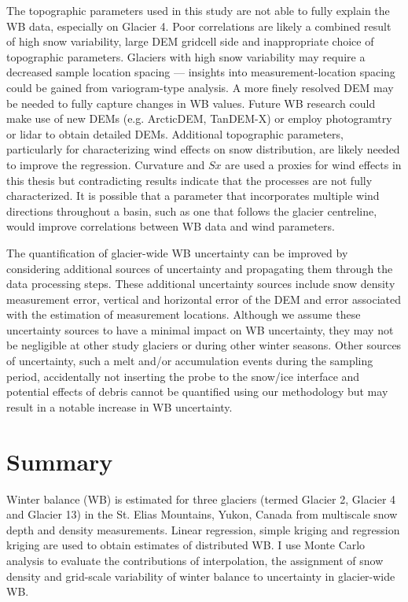 \documentclass{sfuthesis}
\begin{document}
The topographic parameters used in this study are not able to fully explain the WB data, especially on Glacier 4. Poor correlations are likely a combined result of high snow variability, large DEM gridcell side and inappropriate choice of topographic parameters. Glaciers with high snow variability may require a decreased sample location spacing --- insights into measurement-location spacing could be gained from variogram-type analysis. A more finely resolved DEM may be needed to fully capture changes in WB values. Future WB research could make use of new DEMs (e.g. ArcticDEM, TanDEM-X) or employ photogramtry or lidar to obtain detailed DEMs. Additional topographic parameters, particularly for characterizing wind effects on snow distribution, are likely needed to improve the regression. Curvature and $Sx$ are used a proxies for wind effects in this thesis but contradicting results indicate that the processes are not fully characterized. It is possible that a parameter that incorporates multiple wind directions throughout a basin, such as one that follows the glacier centreline, would improve correlations between WB data and wind parameters. 

The quantification of glacier-wide WB uncertainty can be improved by considering additional sources of uncertainty and propagating them through the data processing steps. These additional uncertainty sources include snow density measurement error, vertical and horizontal error of the DEM and error associated with the estimation of measurement locations. Although we assume these uncertainty sources to have a minimal impact on WB uncertainty, they may not be negligible at other study glaciers or during other winter seasons. Other sources of uncertainty, such a melt and/or accumulation events during the sampling period, accidentally not inserting the probe to the snow/ice interface and potential effects of debris cannot be quantified using our methodology but may result in a notable increase in WB uncertainty. 

\section{Summary}

Winter balance (WB) is estimated for three glaciers (termed Glacier 2, Glacier 4 and Glacier 13) in the St. Elias Mountains, Yukon, Canada from multiscale snow depth and density measurements. Linear regression, simple kriging and regression kriging are used to obtain estimates of distributed WB. I use Monte Carlo analysis to evaluate the contributions of interpolation, the assignment of snow density and grid-scale variability of winter balance to uncertainty in glacier-wide WB. 
\end{document}
